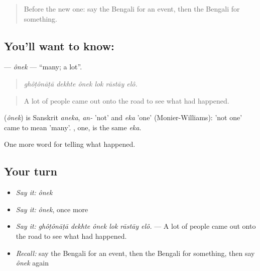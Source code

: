 \label{lesson:BN-C276-onek}



\begin{quote}
Before the new one: say the Bengali for an event, then the Bengali for something.
\end{quote}

\subsection*{You'll want to know: }
\textbf{} — \emph{ônek} — \textquotedblleft{}many; a lot\textquotedblright{}.

\begin{quote}
     
\end{quote}

\begin{quote}
\emph{ghôṭônāṭā dekhte ônek lok rāstāy elô.}
\end{quote}

\begin{quote}
A lot of people came out onto the road to see what had happened.
\end{quote}

\begin{cousinweb}
\textbf{} (\emph{ônek}) is Sanskrit \emph{aneka}, \emph{an-} 'not' and \emph{eka} 'one' (Monier-Williams): 'not one' came to mean 'many'. \textbf{}, one, is the same \emph{eka}.
\end{cousinweb}

\begin{grammarlens}[title={What you've built}]
One more word for telling what happened.
\end{grammarlens}

\subsection*{Your turn}
\begin{itemize}
\raggedright
  \item \emph{Say it:} \emph{ônek}
  \item \emph{Say it:} \emph{ônek}, once more
  \item \emph{Say it:} \emph{ghôṭônāṭā dekhte ônek lok rāstāy elô.} — A lot of people came out onto the road to see what had happened.
  \item \emph{Recall:} say the Bengali for an event, then the Bengali for something, then say \emph{ônek} again
\end{itemize}

